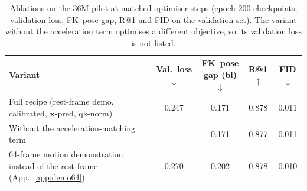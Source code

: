\begin{table}[t]
\centering\small
\caption{Ablations on the \num{36}M pilot at matched optimiser steps (epoch-200 checkpoints;
validation loss, FK--pose gap, R@1 and FID on the validation set). The variant without the
acceleration term optimises a different objective, so its validation loss is not listed.}\label{tab:ablation}
\begin{tabular}{lcccc}
\toprule
Variant & Val.\ loss$\downarrow$ & FK--pose gap (bl)$\downarrow$ & R@1$\uparrow$ & FID$\downarrow$ \\
\midrule
Full recipe (rest-frame demo, calibrated, $\mathbf{x}$-pred, qk-norm) & \num{0.247} & \num{0.171} & \num{0.878} & \num{0.011} \\
Without the acceleration-matching term & -- & \num{0.171} & \num{0.877} & \num{0.011} \\
64-frame motion demonstration instead of the rest frame (App.~\ref{app:demo64}) & \num{0.270} & \num{0.202} & \num{0.878} & \num{0.010} \\
\bottomrule
\end{tabular}
\end{table}
